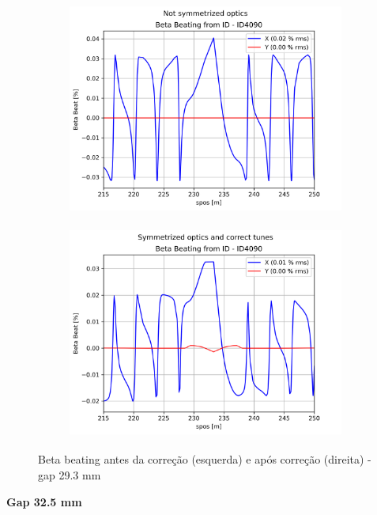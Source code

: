 \documentclass[a4paper,12pt]{article}
\begin{document}
\begin{figure}[H]
\begin{subfigure}{0.5\textwidth}
\includegraphics[width=0.9\linewidth, height=7cm]{figs/phase16 gap29 uncorrected-optics.png} 
\label{fig:subim11629}
\end{subfigure}
\begin{subfigure}{0.5\textwidth}
\includegraphics[width=0.9\linewidth, height=7cm]{figs/phase16 gap29 corrected-optics-tunes.png}
\label{fig:subim21629}
\end{subfigure}
\caption{Beta beating antes da correção (esquerda) e após correção (direita) - gap 29.3 mm}
\label{fig:bb16_29}
\end{figure}

\textbf{Gap 32.5 mm} \\
\end{document}
